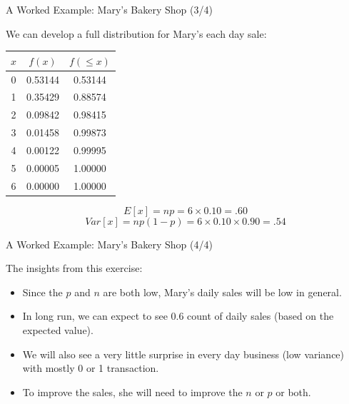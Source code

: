 \documentclass{beamer}
\begin{document}
\begin{frame}{A Worked Example: Mary's Bakery Shop (3/4)}

We can develop a full distribution for Mary's each day sale: 
\vspace{0.3 cm}

\begin{center}
\begin{tabular}{c|c|c}
\hline
$x$ & $f(x)$  & $f(\leq x)$ \\ \hline
0   & 0.53144 & 0.53144    \\ \hline
1   & 0.35429 & 0.88574    \\ \hline
2   & 0.09842 & 0.98415    \\ \hline
3   & 0.01458 & 0.99873    \\ \hline
4   & 0.00122 & 0.99995    \\ \hline
5   & 0.00005 & 1.00000    \\ \hline
6   & 0.00000 & 1.00000    \\ \hline
\end{tabular}
\end{center}

\vspace{0.3 cm}
$$E[x] = np = 6\times 0.10 = .60$$
$$Var[x] = np(1-p) = 6\times 0.10 \times 0.90 = .54$$

\end{frame}




\begin{frame}{A Worked Example: Mary's Bakery Shop (4/4)}

The insights from this exercise: 
\begin{itemize}
\item Since the $p$ and $n$ are both low, Mary's daily sales will be low in general.
\item In long run, we can expect to see 0.6 count of daily sales (based on the expected value).
\item We will also see a very little surprise in every day business (low variance) with mostly 0 or 1 transaction.
\item To improve the sales, she will need to improve the $n$ or $p$ or both.
\end{itemize}

\end{frame}
\end{document}
